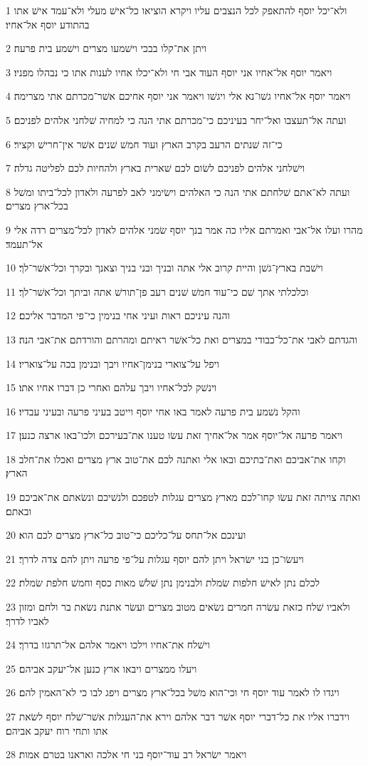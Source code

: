 \par 1 ולא־יכל יוסף להתאפק לכל הנצבים עליו ויקרא הוציאו כל־אישׁ מעלי ולא־עמד אישׁ אתו בהתודע יוסף אל־אחיו׃
\par 2 ויתן את־קלו בבכי וישׁמעו מצרים וישׁמע בית פרעה׃
\par 3 ויאמר יוסף אל־אחיו אני יוסף העוד אבי חי ולא־יכלו אחיו לענות אתו כי נבהלו מפניו׃
\par 4 ויאמר יוסף אל־אחיו גשׁו־נא אלי ויגשׁו ויאמר אני יוסף אחיכם אשׁר־מכרתם אתי מצרימה׃
\par 5 ועתה אל־תעצבו ואל־יחר בעיניכם כי־מכרתם אתי הנה כי למחיה שׁלחני אלהים לפניכם׃
\par 6 כי־זה שׁנתים הרעב בקרב הארץ ועוד חמשׁ שׁנים אשׁר אין־חרישׁ וקציר׃
\par 7 וישׁלחני אלהים לפניכם לשׂום לכם שׁארית בארץ ולהחיות לכם לפליטה גדלה׃
\par 8 ועתה לא־אתם שׁלחתם אתי הנה כי האלהים וישׂימני לאב לפרעה ולאדון לכל־ביתו ומשׁל בכל־ארץ מצרים׃
\par 9 מהרו ועלו אל־אבי ואמרתם אליו כה אמר בנך יוסף שׂמני אלהים לאדון לכל־מצרים רדה אלי אל־תעמד׃
\par 10 וישׁבת בארץ־גשׁן והיית קרוב אלי אתה ובניך ובני בניך וצאנך ובקרך וכל־אשׁר־לך׃
\par 11 וכלכלתי אתך שׁם כי־עוד חמשׁ שׁנים רעב פן־תורשׁ אתה וביתך וכל־אשׁר־לך׃
\par 12 והנה עיניכם ראות ועיני אחי בנימין כי־פי המדבר אליכם׃
\par 13 והגדתם לאבי את־כל־כבודי במצרים ואת כל־אשׁר ראיתם ומהרתם והורדתם את־אבי הנה׃
\par 14 ויפל על־צוארי בנימן־אחיו ויבך ובנימן בכה על־צואריו׃
\par 15 וינשׁק לכל־אחיו ויבך עלהם ואחרי כן דברו אחיו אתו׃
\par 16 והקל נשׁמע בית פרעה לאמר באו אחי יוסף וייטב בעיני פרעה ובעיני עבדיו׃
\par 17 ויאמר פרעה אל־יוסף אמר אל־אחיך זאת עשׂו טענו את־בעירכם ולכו־באו ארצה כנען׃
\par 18 וקחו את־אביכם ואת־בתיכם ובאו אלי ואתנה לכם את־טוב ארץ מצרים ואכלו את־חלב הארץ׃
\par 19 ואתה צויתה זאת עשׂו קחו־לכם מארץ מצרים עגלות לטפכם ולנשׁיכם ונשׂאתם את־אביכם ובאתם׃
\par 20 ועינכם אל־תחס על־כליכם כי־טוב כל־ארץ מצרים לכם הוא׃
\par 21 ויעשׂו־כן בני ישׂראל ויתן להם יוסף עגלות על־פי פרעה ויתן להם צדה לדרך׃
\par 22 לכלם נתן לאישׁ חלפות שׂמלת ולבנימן נתן שׁלשׁ מאות כסף וחמשׁ חלפת שׂמלת׃
\par 23 ולאביו שׁלח כזאת עשׂרה חמרים נשׂאים מטוב מצרים ועשׂר אתנת נשׂאת בר ולחם ומזון לאביו לדרך׃
\par 24 וישׁלח את־אחיו וילכו ויאמר אלהם אל־תרגזו בדרך׃
\par 25 ויעלו ממצרים ויבאו ארץ כנען אל־יעקב אביהם׃
\par 26 ויגדו לו לאמר עוד יוסף חי וכי־הוא משׁל בכל־ארץ מצרים ויפג לבו כי לא־האמין להם׃
\par 27 וידברו אליו את כל־דברי יוסף אשׁר דבר אלהם וירא את־העגלות אשׁר־שׁלח יוסף לשׂאת אתו ותחי רוח יעקב אביהם׃
\par 28 ויאמר ישׂראל רב עוד־יוסף בני חי אלכה ואראנו בטרם אמות׃

